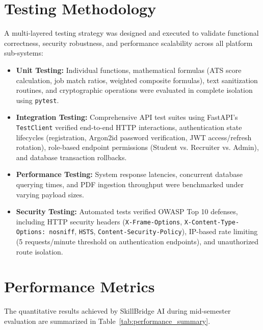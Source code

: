 \documentclass[12pt,a4paper,oneside]{report}
\begin{document}
\section{Testing Methodology}
A multi-layered testing strategy was designed and executed to validate functional correctness, security robustness, and performance scalability across all platform sub-systems:
\begin{itemize}[leftmargin=0.8cm]
    \item \textbf{Unit Testing:} Individual functions, mathematical formulas (ATS score calculation, job match ratios, weighted composite formulas), text sanitization routines, and cryptographic operations were evaluated in complete isolation using \texttt{pytest}.
    \item \textbf{Integration Testing:} Comprehensive API test suites using FastAPI's \texttt{TestClient} verified end-to-end HTTP interactions, authentication state lifecycles (registration, Argon2id password verification, JWT access/refresh rotation), role-based endpoint permissions (Student vs. Recruiter vs. Admin), and database transaction rollbacks.
    \item \textbf{Performance Testing:} System response latencies, concurrent database querying times, and PDF ingestion throughput were benchmarked under varying payload sizes.
    \item \textbf{Security Testing:} Automated tests verified OWASP Top 10 defenses, including HTTP security headers (\texttt{X-Frame-Options}, \texttt{X-Content-Type-Options: nosniff}, \texttt{HSTS}, \texttt{Content-Security-Policy}), IP-based rate limiting (5 requests/minute threshold on authentication endpoints), and unauthorized route isolation.
\end{itemize}

\section{Performance Metrics}
The quantitative results achieved by SkillBridge AI during mid-semester evaluation are summarized in Table~\ref{tab:performance_summary}.
\end{document}

